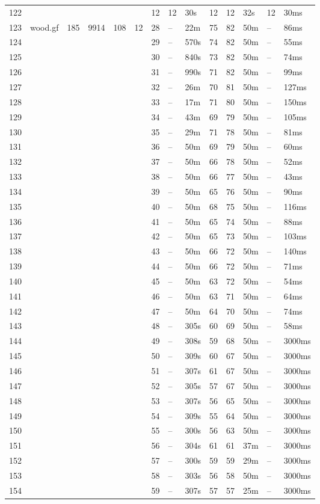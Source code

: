 \documentclass{article}
\begin{document}
\begin{longtable}{|l |l |l |l |l |l |l |l |l |l |l |l |l |l |}
122&&&&&&12&12&30s&12&12&32s&12&30ms\\
123&wood.gf&185&9914&108&12&28&--&22m&75&82&50m&--&86ms\\
124&&&&&&29&--&570s&74&82&50m&--&55ms\\
125&&&&&&30&--&840s&73&82&50m&--&74ms\\
126&&&&&&31&--&990s&71&82&50m&--&99ms\\
127&&&&&&32&--&26m&70&81&50m&--&127ms\\
128&&&&&&33&--&17m&71&80&50m&--&150ms\\
129&&&&&&34&--&43m&69&79&50m&--&105ms\\
130&&&&&&35&--&29m&71&78&50m&--&81ms\\
131&&&&&&36&--&50m&69&79&50m&--&60ms\\
132&&&&&&37&--&50m&66&78&50m&--&52ms\\
133&&&&&&38&--&50m&66&77&50m&--&43ms\\
134&&&&&&39&--&50m&65&76&50m&--&90ms\\
135&&&&&&40&--&50m&68&75&50m&--&116ms\\
136&&&&&&41&--&50m&65&74&50m&--&88ms\\
137&&&&&&42&--&50m&65&73&50m&--&103ms\\
138&&&&&&43&--&50m&66&72&50m&--&140ms\\
139&&&&&&44&--&50m&66&72&50m&--&71ms\\
140&&&&&&45&--&50m&63&72&50m&--&54ms\\
141&&&&&&46&--&50m&63&71&50m&--&64ms\\
142&&&&&&47&--&50m&64&70&50m&--&74ms\\
143&&&&&&48&--&305s&60&69&50m&--&58ms\\
144&&&&&&49&--&308s&59&68&50m&--&3000ms\\
145&&&&&&50&--&309s&60&67&50m&--&3000ms\\
146&&&&&&51&--&307s&61&67&50m&--&3000ms\\
147&&&&&&52&--&305s&57&67&50m&--&3000ms\\
148&&&&&&53&--&307s&56&65&50m&--&3000ms\\
149&&&&&&54&--&309s&55&64&50m&--&3000ms\\
150&&&&&&55&--&300s&56&63&50m&--&3000ms\\
151&&&&&&56&--&304s&61&61&37m&--&3000ms\\
152&&&&&&57&--&300s&59&59&29m&--&3000ms\\
153&&&&&&58&--&303s&56&58&50m&--&3000ms\\
154&&&&&&59&--&307s&57&57&25m&--&3000ms\\

\end{longtable}
\end{document}
